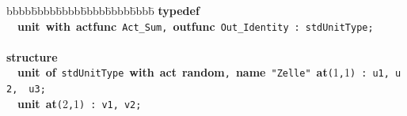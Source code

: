 \begin{tabbing}bbbb\=bbbb\=bbbb\=bbbb\=bbbb\=bbbb\=\kill
{\bf typedef}\\
~~{\bf unit}~{\bf with}~{\bf actfunc}~\verb&Act_Sum&\verb&,&~{\bf outfunc}~\verb&Out_Identity&~\verb&:&~\verb&stdUnitType&\verb&;&\\
\\
{\bf structure}\\
~~{\bf unit}~{\bf of}~\verb&stdUnitType&~{\bf with}~{\bf act}~{\bf random}\verb&,&~{\bf name}~\verb&"Zelle"&~{\bf at}\verb&(&1\verb&,&1\verb&)&~\verb&:&~\verb&u1&\verb&,&~\verb&u2&\verb&,&~~\verb&u3&\verb&;&\\
~~{\bf unit}~{\bf at}\verb&(&2\verb&,&1\verb&)&~\verb&:&~\verb&v1&\verb&,&~\verb&v2&\verb&;&\\
\end{tabbing}
